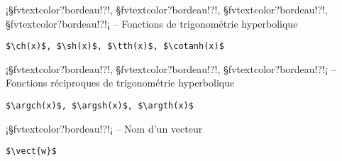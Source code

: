 \documentclass[11pt,a4paper,rgb]{report}
\begin{document}
\inCodeStub¡§fvtextcolor?bordeau!?\ch{}!, §fvtextcolor?bordeau!?\sh{}!, §fvtextcolor?bordeau!?\tth{}!, §fvtextcolor?bordeau!?\cotanh{}!¡ -- Fonctions de trigonométrie hyperbolique

\setlength{\leftskip}{.75cm}%
\setlength{\textwidth}{17.25cm}%

\colorbox{blue!15}{}
\hfill
\begin{minipage}{.65\textwidth}
	\begin{lstlisting}[linewidth=\textwidth, language={[LaTeX]TeX}]
	$\ch(x)$, $\sh(x)$, $\tth(x)$, $\cotanh(x)$
	\end{lstlisting}
\end{minipage}

\setlength{\leftskip}{0pt}
\setlength{\textwidth}{18cm}%


\vspace*{.75cm}

\inCodeStub¡§fvtextcolor?bordeau!?\argch{}!, §fvtextcolor?bordeau!?\argsh{}!, §fvtextcolor?bordeau!?\argth{}!¡ -- Fonctions réciproques de trigonométrie hyperbolique

\setlength{\leftskip}{.75cm}%
\setlength{\textwidth}{17.25cm}%

\colorbox{blue!15}{}
\hfill
\begin{minipage}{.65\textwidth}
	\begin{lstlisting}[linewidth=\textwidth, language={[LaTeX]TeX}]
	$\argch(x)$, $\argsh(x)$, $\argth(x)$
	\end{lstlisting}
\end{minipage}

\setlength{\leftskip}{0pt}
\setlength{\textwidth}{18cm}%


\vspace*{.75cm}

\inCodeStub¡§fvtextcolor?bordeau!?!¡ -- Nom d'un vecteur

\setlength{\leftskip}{.75cm}%
\setlength{\textwidth}{17.25cm}%

\colorbox{blue!15}{}
\hfill
\begin{minipage}{.65\textwidth}
	\begin{lstlisting}[linewidth=\textwidth, language={[LaTeX]TeX}]
	$\vect{w}$
	\end{lstlisting}
\end{minipage}
\end{document}
